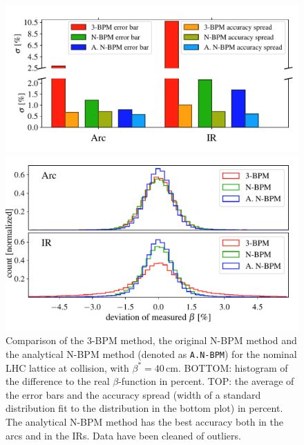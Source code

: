 \begin{figure}
	\centering
  \includegraphics[width=\linewidth]{comparison_statistics_007_bars}
	
    \includegraphics[width=\linewidth]{comparison_statistics_006}
	\caption{Comparison of the 3-BPM method, the original N-BPM method and the analytical N-BPM method (denoted as \texttt{A.N-BPM}) for the nominal LHC lattice at collision, with $ \beta^*=40\,\text{cm} $. BOTTOM: histogram of the difference to the real $\beta$-function in percent. TOP: the average of the error bars and the accuracy spread (width of a standard distribution fit to the distribution in the bottom plot) in percent.  The analytical N-BPM method has the best accuracy both in the arcs and in the IRs. Data have been cleaned of outliers.}
	\label{fig:compare_NBPM_to_3BPM}
\end{figure}

